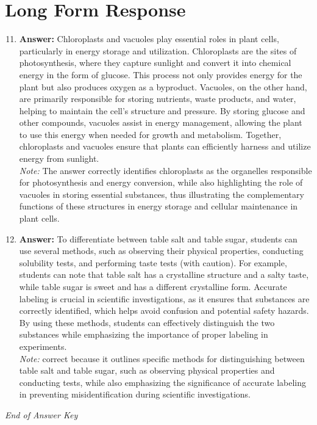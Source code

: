 \documentclass[12pt]{article}
\begin{document}
\section*{Long Form Response}
\begin{enumerate}[label=\arabic*.]
\setcounter{enumi}{10}
\item \textbf{Answer:} Chloroplasts and vacuoles play essential roles in plant cells, particularly in energy storage and utilization. Chloroplasts are the sites of photosynthesis, where they capture sunlight and convert it into chemical energy in the form of glucose. This process not only provides energy for the plant but also produces oxygen as a byproduct. Vacuoles, on the other hand, are primarily responsible for storing nutrients, waste products, and water, helping to maintain the cell's structure and pressure. By storing glucose and other compounds, vacuoles assist in energy management, allowing the plant to use this energy when needed for growth and metabolism. Together, chloroplasts and vacuoles ensure that plants can efficiently harness and utilize energy from sunlight.
\\ \textit{Note:} The answer correctly identifies chloroplasts as the organelles responsible for photosynthesis and energy conversion, while also highlighting the role of vacuoles in storing essential substances, thus illustrating the complementary functions of these structures in energy storage and cellular maintenance in plant cells.
\item \textbf{Answer:} To differentiate between table salt and table sugar, students can use several methods, such as observing their physical properties, conducting solubility tests, and performing taste tests (with caution). For example, students can note that table salt has a crystalline structure and a salty taste, while table sugar is sweet and has a different crystalline form. Accurate labeling is crucial in scientific investigations, as it ensures that substances are correctly identified, which helps avoid confusion and potential safety hazards. By using these methods, students can effectively distinguish the two substances while emphasizing the importance of proper labeling in experiments.
\\ \textit{Note:} correct because it outlines specific methods for distinguishing between table salt and table sugar, such as observing physical properties and conducting tests, while also emphasizing the significance of accurate labeling in preventing misidentification during scientific investigations.
\end{enumerate}

\vfill
\noindent\textit{End of Answer Key}
\end{document}
